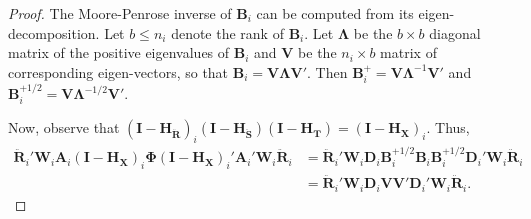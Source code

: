 \documentclass[12pt]{article}\usepackage[]{graphicx}\usepackage[]{color}
\newcommand{\bm}{\mathbf}
\newcommand{\bs}{\boldsymbol}
\begin{document}
\begin{proof}
The Moore-Penrose inverse of $\bm{B}_i$ can be computed from its eigen-decomposition. Let $b \leq n_i$ denote the rank of $\bm{B}_i$. 
Let $\bs\Lambda$ be the $b \times b$ diagonal matrix of the positive eigenvalues of $\bm{B}_i$ and $\bm{V}$ be the $n_i \times b$ matrix of corresponding eigen-vectors, so that $\bm{B}_i = \bm{V}\bs\Lambda\bm{V}'$. 
Then $\bm{B}_i^+ = \bm{V}\bs\Lambda^{-1}\bm{V}'$ and $\bm{B}_i^{+1/2} = \bm{V}\bs\Lambda^{-1/2}\bm{V}'$.

Now, observe that $\left(\bm{I} - \bm{H_{\ddot{R}}}\right)_i \left(\bm{I} - \bm{H_{\ddot{S}}}\right) \left(\bm{I} - \bm{H_T}\right) = \left(\bm{I} - \bm{H_X}\right)_i$. Thus, 
\begin{align}
\label{eq:step1}
\bm{\ddot{R}}_i' \bm{W}_i \bm{A}_i \left(\bm{I} - \bm{H_X}\right)_i \bs\Phi \left(\bm{I} - \bm{H_X}\right)_i' \bm{A}_i' \bm{W}_i \bm{\ddot{R}}_i &= \bm{\ddot{R}}_i' \bm{W}_i \bm{D}_i \bm{B}_i^{+1/2} \bm{B}_i \bm{B}_i^{+1/2} \bm{D}_i' \bm{W}_i \bm{\ddot{R}}_i \nonumber \\
&= \bm{\ddot{R}}_i' \bm{W}_i \bm{D}_i \bm{V}\bm{V}' \bm{D}_i' \bm{W}_i \bm{\ddot{R}}_i. 
\end{align}


\end{proof}
\end{document}
